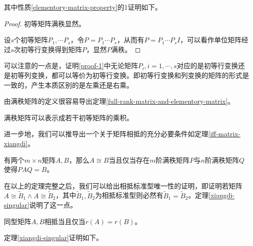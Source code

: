其中性质\ref{elementory-matrix-property}的1证明如下。
\begin{proof}
    \label{proof-1}
    初等矩阵满秩显然。

    设$s$个初等矩阵$P_1,\cdots P_s$，令$P=P_1\cdots P_s$，从而有$P=P_1\cdots P_sI$，可以看作单位矩阵经过$s$次初等行变换得到矩阵$P$，显然$P$满秩。
\end{proof}

\begin{remark}
    可以注意的一点是，证明\ref{proof-1}中无论矩阵$P_i,i=1,\cdots,s$对应的是初等行变换还是初等列变换，都可以等价为初等行变换。即初等行变换和列变换的矩阵的形式是一致的，产生本质区别的是左乘还是右乘。
\end{remark}

由满秩矩阵的定义很容易导出定理\ref{full-rank-matrix-and-elementory-matrix}。

\begin{thm}
    \label{full-rank-matrix-and-elementory-matrix}
    满秩矩阵可以表示成若干初等矩阵的乘积。
\end{thm}

进一步地，我们可以推导出一个关于矩阵相抵的充分必要条件如定理\ref{iff-matrix-xiangdi}。

\begin{thm}
    \label{iff-matrix-xiangdi}
    有两个$m\times n$矩阵$A,B$，那么$A\cong B$当且仅当存在$m$阶满秩矩阵$P$与$n$阶满秩矩阵$Q$使得$PAQ=B$。
\end{thm}

在以上的定理完整之后，我们可以给出相抵标准型唯一性的证明，即证明若矩阵$A\cong \tilde{B}_1\wedge A\cong\tilde{B}_2$，其中$\tilde{B}_1,\tilde{B}_2$为相抵标准型则必然有$\tilde{B}_1=\tilde{B}_2$。定理\ref{xiangdi-singular}说明了这一点。

\begin{thm}
    \label{xiangdi-singular}
    同型矩阵$A,B$相抵当且仅当$r(A)=r(B)$。
\end{thm}

定理\ref{xiangdi-singular}证明如下。

